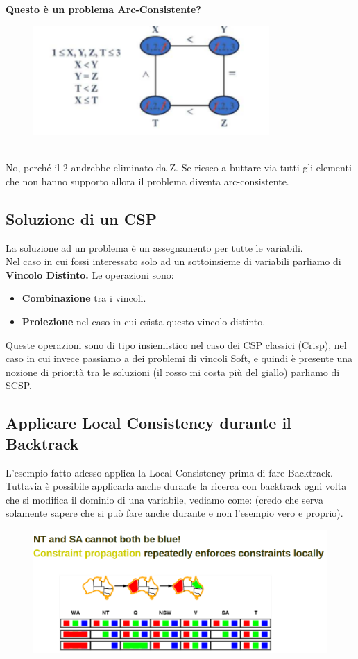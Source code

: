 \vspace{0.8cm}

\textbf{Questo è un problema Arc-Consistente?}
\begin{figure}[htp]
    \centering
    \includegraphics[width=9cm, keepaspectratio]{img/Cap3/riassunto2.png}
\end{figure}
\\No, perché il 2 andrebbe eliminato da Z. Se riesco a buttare via tutti gli
elementi che non hanno supporto allora il problema diventa arc-consistente.

\subsection{Soluzione di un CSP}
La soluzione ad un problema è un assegnamento per tutte le variabili. \\Nel caso
in cui fossi interessato solo ad un sottoinsieme di variabili parliamo di
\textbf{Vincolo Distinto.} Le operazioni sono:
\begin{itemize}
    \item  \textbf{Combinazione} tra i vincoli.
    \item \textbf{Proiezione} nel caso in cui esista questo vincolo distinto.
\end{itemize}
Queste operazioni sono di tipo insiemistico nel caso dei CSP classici (Crisp),
nel caso in cui invece passiamo a dei problemi di vincoli Soft, e quindi è
presente una nozione di priorità tra le soluzioni (il rosso mi costa più del
giallo) parliamo di SCSP.

\subsection{Applicare Local Consistency durante il Backtrack}
L'esempio fatto adesso applica la Local Consistency prima di fare Backtrack.
Tuttavia è possibile applicarla anche durante la ricerca con backtrack ogni
volta che si modifica il dominio di una variabile, vediamo come: (credo che
serva solamente sapere che si può fare anche durante e non l'esempio vero e
proprio).
\begin{figure}[htp]
    \centering
    \includegraphics[width=12cm, keepaspectratio]{img/Cap3/prova3.png}
\end{figure}


